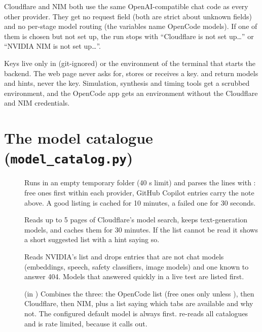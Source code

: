 Cloudflare and NIM both use the same OpenAI-compatible chat code as every other provider. They get no  request field (both are strict about unknown fields) and no per-stage model routing (the  variables name OpenCode models). If one of them is chosen but not set up, the run stops with ``Cloudflare is not set up\ldots'' or ``NVIDIA NIM is not set up\ldots''.

\begin{keyidea}
Keys live only in  (git-ignored) or the environment of the terminal that starts the backend. The web page never asks for, stores or receives a key.  and  return models and hints, never the key. Simulation, synthesis and timing tools get a scrubbed environment, and the OpenCode app gets an environment without the Cloudflare and NIM credentials.
\end{keyidea}

\section{The model catalogue (\texttt{model\_catalog.py})}

\begin{description}
  \item[] Runs  in an empty temporary folder (40 s limit) and parses the  lines with : free ones first within each provider, GitHub Copilot entries carry the note above. A good listing is cached for 10 minutes, a failed one for 30 seconds.
  \item[] Reads up to 5 pages of Cloudflare's model search, keeps text-generation models, and caches them for 30 minutes. If the list cannot be read it shows a short suggested list with a hint saying so.
  \item[] Reads NVIDIA's  list and drops entries that are not chat models (embeddings, speech, safety classifiers, image models) and one known to answer 404. Models that answered quickly in a live test are listed first.
  \item[] (in ) Combines the three: the OpenCode list (free ones only unless ), then Cloudflare, then NIM, plus a  list saying which tabs are available and why not. The configured default model is always first.  re-reads all catalogues and is rate limited, because it calls out.
\end{description}

